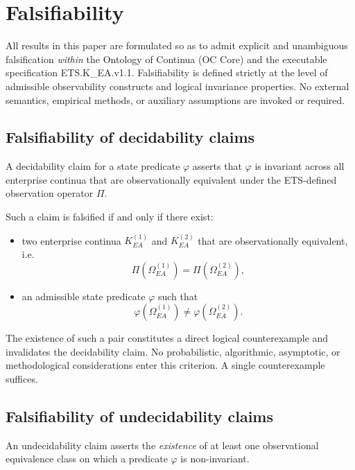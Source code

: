 \section{Falsifiability}
\label{sec:falsifiability}

All results in this paper are formulated so as to admit explicit and
unambiguous falsification \emph{within} the Ontology of Continua (OC
Core) and the executable specification ETS.K\_EA.v1.1. Falsifiability is
defined strictly at the level of admissible observability constructs
and logical invariance properties. No external semantics, empirical
methods, or auxiliary assumptions are invoked or required.

\subsection{Falsifiability of decidability claims}
\label{subsec:falsifiability-decidable}

A decidability claim for a state predicate $\varphi$ asserts that
$\varphi$ is invariant across all enterprise continua that are
observationally equivalent under the ETS-defined observation operator
$\Pi$.

Such a claim is falsified if and only if there exist:
\begin{itemize}
\item two enterprise continua $K_{EA}^{(1)}$ and $K_{EA}^{(2)}$ that are
      observationally equivalent, i.e.\
      \[
      \Pi(\Omega_{EA}^{(1)}) = \Pi(\Omega_{EA}^{(2)}),
      \]
\item an admissible state predicate $\varphi$ such that
      \[
      \varphi(\Omega_{EA}^{(1)}) \neq \varphi(\Omega_{EA}^{(2)}).
      \]
\end{itemize}

The existence of such a pair constitutes a direct logical
counterexample and invalidates the decidability claim. No probabilistic,
algorithmic, asymptotic, or methodological considerations enter this
criterion. A single counterexample suffices.

\subsection{Falsifiability of undecidability claims}
\label{subsec:falsifiability-undecidable}

An undecidability claim asserts the \emph{existence} of at least one
observational equivalence class on which a predicate $\varphi$ is
non-invariant.

